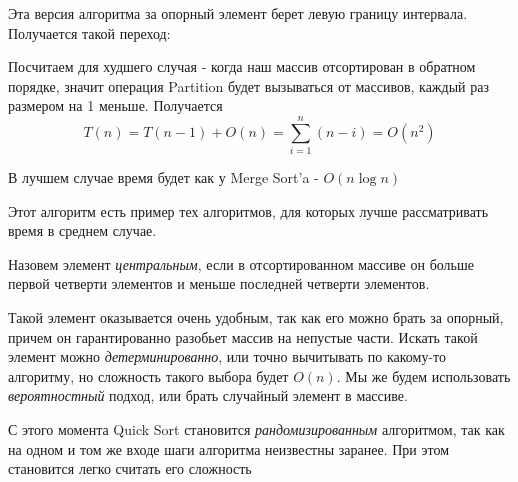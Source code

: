 \documentclass[../main.tex]{subfiles}
\begin{document}
	
	Эта версия алгоритма за опорный элемент берет левую границу интервала. Получается такой переход:
	
	\begin{center}
	\end{center}
	
	\begin{time}
		Посчитаем для худшего случая - когда наш массив отсортирован в обратном порядке, значит операция Partition будет вызываться от массивов, каждый раз размером на 1 меньше. Получается 
		\[
		T(n) = T(n - 1) + O(n) = \sum_{i = 1}^n (n - i) = O(n^2)
		\]
		
		В лучшем случае время будет как у Merge Sort'a - $O(n\log n)$
	\end{time}
	
	Этот алгоритм есть пример тех алгоритмов, для которых лучше рассматривать время в среднем случае. 
		
	\begin{definition}
		Назовем элемент \textit{центральным}, если в отсортированном массиве он больше первой четверти элементов и меньше последней четверти элементов.
	\end{definition}
	
	Такой элемент оказывается очень удобным, так как его можно брать за опорный, причем он гарантированно разобьет массив на непустые части. Искать такой элемент можно \textit{детерминированно}, или точно вычитывать по какому-то алгоритму, но сложность такого выбора будет $O(n)$. Мы же будем использовать \textit{вероятностный} подход, или брать случайный элемент в массиве. 
	
	С этого момента Quick Sort становится \textit{рандомизированным} алгоритмом, так как на одном и том же входе шаги алгоритма неизвестны заранее. При этом становится легко считать его сложность
	
\end{document}
